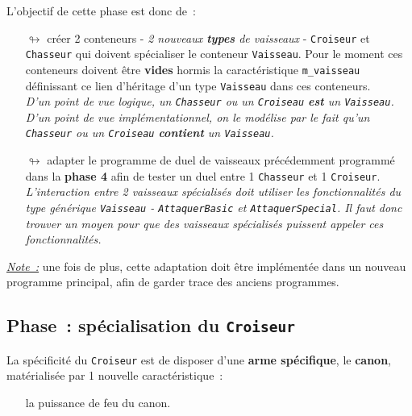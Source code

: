 \documentclass[10pt, fleqn, a4paper]{article}
\newcommand{\bfcolor}[2]{\textcolor{#1}{\textbf{#2}}}
\newcommand{\itcolor}[2]{\textcolor{#1}{\textit{#2}}}
\newcommand\myframecolor{}
\newcommand\mybgcolor{}
\newenvironment{mycolorbox}[2]
{
\def\myframecolor{#1}
\def\mybgcolor{#2}
\begingroup
\begin{lrbox}{\mytextbox}
\begin{minipage}[t]{\textwidth}
}
{
\end{minipage}\end{lrbox}
\fcolorbox{\myframecolor}{\mybgcolor}{\usebox{\mytextbox}}
\endgroup
}
\newcounter{quest}
\begin{document}
L'objectif de cette phase est donc de~:
\begin{itemize}
\item[$\looparrowright$] créer 2 conteneurs - \itcolor{redCM}{2 nouveaux \textbf{types} de vaisseaux} - \texttt{Croiseur} et \texttt{Chasseur} qui doivent \og{}spécialiser\fg{} le conteneur \texttt{Vaisseau}. Pour le moment ces conteneurs doivent être \bfcolor{blueTD}{vides} hormis la caractéristique \texttt{m\_vaisseau} définissant ce lien \og{}d'héritage\fg{} d'un type \texttt{Vaisseau} dans ces conteneurs.\\
\itcolor{redCM}{D'un point de vue logique, un \textnormal{\texttt{Chasseur}} ou un \textnormal{\texttt{Croiseau}} \textbf{est} un \textnormal{\texttt{Vaisseau}}. D'un point de vue implémentationnel, on le modélise par le fait qu'un \textnormal{\texttt{Chasseur}} ou un \textnormal{\texttt{Croiseau}} \textbf{contient} un \textnormal{\texttt{Vaisseau}}.}
\item[$\looparrowright$] adapter le programme de duel de vaisseaux précédemment programmé dans la \bfcolor{greenTP}{phase 4} afin de tester un duel entre 1 \texttt{Chasseur} et 1 \texttt{Croiseur}.\\
\itcolor{redCM}{L'interaction entre 2 vaisseaux spécialisés doit utiliser les fonctionnalités du type générique \texttt{Vaisseau} - \textnormal{\texttt{AttaquerBasic}} et \textnormal{\texttt{AttaquerSpecial}}. Il faut donc trouver un moyen pour que des vaisseaux spécialisés puissent \og{}appeler\fg{} ces fonctionnalités.}
\end{itemize}

\begin{mycolorbox}{black}{yellow}
\itcolor{redCM}{\underline{Note~:}} une fois de plus, cette adaptation doit être implémentée dans un nouveau programme principal, afin de garder trace des anciens programmes.
\end{mycolorbox}

\addtocounter{quest}{1}
\subsection*{Phase~\thequest : spécialisation du \texttt{Croiseur}}
\label{phase_croiseur}

La spécificité du \texttt{Croiseur} est de disposer d'une \bfcolor{blueTD}{arme spécifique}, le \bfcolor{blueTD}{canon}, matérialisée par 1 nouvelle caractéristique~:
\begin{itemize}
\item[\ding{223}] la puissance de feu du canon.
\end{itemize}
\end{document}
